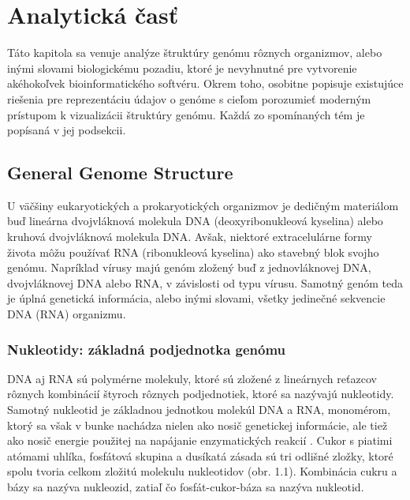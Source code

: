 
\chapter{Analytická časť}

Táto kapitola sa venuje analýze štruktúry genómu rôznych organizmov, alebo inými slovami biologickému pozadiu, ktoré je nevyhnutné pre vytvorenie akéhokoľvek bioinformatického softvéru.
Okrem toho, osobitne popisuje existujúce riešenia pre reprezentáciu údajov o genóme s cieľom porozumieť moderným prístupom k vizualizácii štruktúry genómu. 
Každá zo spomínaných tém je popísaná v jej podsekcii.

\section{General Genome Structure}
U väčšiny eukaryotických a prokaryotických organizmov je dedičným materiálom buď lineárna dvojvláknová molekula DNA (deoxyribonukleová kyselina) alebo kruhová dvojvláknová molekula DNA.
Avšak, niektoré extracelulárne formy života môžu používať RNA (ribonukleová kyselina) ako stavebný blok svojho genómu.
Napríklad vírusy majú genóm zložený buď z jednovláknovej DNA, dvojvláknovej DNA alebo RNA, v závislosti od typu vírusu.
Samotný genóm teda je úplná genetická informácia, alebo inými slovami, všetky jedinečné sekvencie DNA (RNA) organizmu.

\subsection{Nukleotidy: základná podjednotka genómu}
DNA aj RNA sú polymérne molekuly, ktoré sú zložené z lineárnych reťazcov rôznych kombinácií štyroch rôznych podjednotiek, ktoré sa nazývajú nukleotidy.
Samotný nukleotid je základnou jednotkou molekúl DNA a RNA, monomérom, ktorý sa však v bunke nachádza nielen ako nosič genetickej informácie,
ale tiež ako nosič energie použitej na napájanie enzymatických reakcií \cite{AnalysisOfGenesAndGenomes}. 
Cukor s piatimi atómami uhlíka, fosfátová skupina a dusíkatá zásada sú tri odlišné zložky, ktoré spolu tvoria celkom zložitú molekulu nukleotidov (obr. 1.1).
Kombinácia cukru a bázy sa nazýva nukleozid, zatiaľ čo fosfát-cukor-báza sa nazýva nukleotid. 

